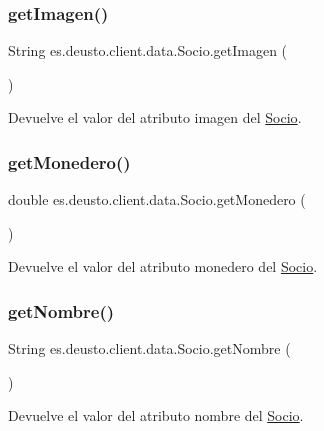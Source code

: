 \subsubsection{\texorpdfstring{getImagen()}{getImagen()}}
{\footnotesize\ttfamily String es.\+deusto.\+client.\+data.\+Socio.\+get\+Imagen (\begin{DoxyParamCaption}{ }\end{DoxyParamCaption})}

Devuelve el valor del atributo imagen del \mbox{\hyperlink{classes_1_1deusto_1_1client_1_1data_1_1_socio}{Socio}}. \mbox{\label{classes_1_1deusto_1_1client_1_1data_1_1_socio_a35b0219047172b5699a4e4b5177fb879}} 
\subsubsection{\texorpdfstring{getMonedero()}{getMonedero()}}
{\footnotesize\ttfamily double es.\+deusto.\+client.\+data.\+Socio.\+get\+Monedero (\begin{DoxyParamCaption}{ }\end{DoxyParamCaption})}

Devuelve el valor del atributo monedero del \mbox{\hyperlink{classes_1_1deusto_1_1client_1_1data_1_1_socio}{Socio}}. \mbox{\label{classes_1_1deusto_1_1client_1_1data_1_1_socio_abf7b3866357ef5c0f19317d745c0d9bc}} 
\subsubsection{\texorpdfstring{getNombre()}{getNombre()}}
{\footnotesize\ttfamily String es.\+deusto.\+client.\+data.\+Socio.\+get\+Nombre (\begin{DoxyParamCaption}{ }\end{DoxyParamCaption})}

Devuelve el valor del atributo nombre del \mbox{\hyperlink{classes_1_1deusto_1_1client_1_1data_1_1_socio}{Socio}}. \mbox{\label{classes_1_1deusto_1_1client_1_1data_1_1_socio_a7799fe265940b5b5296c0b998e62798d}} 
